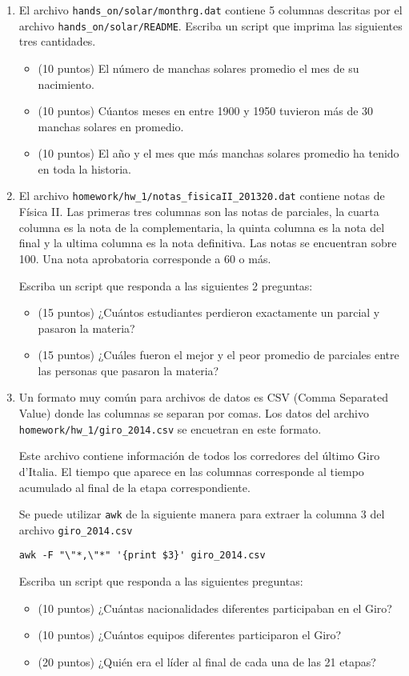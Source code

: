 \documentclass{article}
\begin{document}
\begin{enumerate}

\item El archivo \verb"hands_on/solar/monthrg.dat" contiene 5 columnas descritas por el archivo \verb"hands_on/solar/README". Escriba un script que imprima las siguientes tres cantidades.

\begin{itemize}
\item (10 puntos) El n\'umero de manchas solares promedio el mes de su nacimiento.
\item (10 puntos) C\'uantos  meses en entre 1900 y 1950 tuvieron m\'as de 30 manchas solares en promedio.
\item (10 puntos) El a\~no y el mes que m\'as manchas solares promedio ha tenido en toda la historia. 
\end{itemize}


\item
El archivo \verb"homework/hw_1/notas_fisicaII_201320.dat" contiene notas de
F\'isica II. Las primeras tres columnas son las notas de parciales, la
cuarta columna es la nota de la complementaria, la quinta columna es
la nota del final y la ultima columna es la nota definitiva. Las notas se encuentran sobre 100. Una nota aprobatoria corresponde a 60 o m\'as.

Escriba un script que responda a las siguientes 2 preguntas:
\begin{itemize}
\item (15 puntos) ¿Cu\'antos estudiantes perdieron exactamente un parcial y pasaron la materia?
\item (15 puntos) ¿Cu\'ales fueron el mejor y el peor promedio de parciales entre las personas que pasaron la materia?
\end{itemize}

\item
Un formato muy com\'un para archivos de datos es CSV (Comma Separated Value) donde las columnas se separan por comas. Los datos del archivo \verb"homework/hw_1/giro_2014.csv" se encuetran en este formato. 

Este archivo contiene información de todos los corredores del último Giro d'Italia. El tiempo que aparece en las columnas corresponde al tiempo acumulado al final de la etapa correspondiente.

Se puede utilizar \verb"awk" de la siguiente manera para extraer la columna 3 del archivo \verb"giro_2014.csv"
\begin{verbatim}
awk -F "\"*,\"*" '{print $3}' giro_2014.csv
\end{verbatim}

Escriba un script que responda a las siguientes preguntas:

\begin{itemize}
\item (10 puntos) ¿Cuántas nacionalidades diferentes participaban en el Giro?
\item (10 puntos) ¿Cuántos equipos diferentes participaron el Giro?
\item (20 puntos) ¿Quién era el l\'ider al final de cada una de las 21 etapas? 
\end{itemize}

\end{enumerate}
\end{document}
